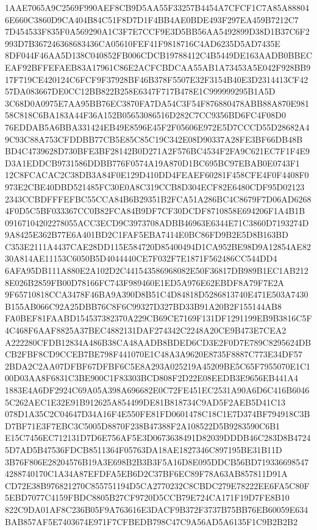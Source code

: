 \documentclass[UTF8,fontset=fandol,zihao=-4,a4paper]{ctexart}
\begin{document}
{{1AAE7065A9C2569F990AEF8CB9D5AA55F33257B4454A7CFCF1C7A85A888046E660C3860D9CA404B84C51F8D7D1F4BB4AE0BDE493F297EA459B7212C7
7D454533F835F0A569290A1C3F7E7CCF9E3D5BB56AA5492899D38D1B37C6F2993D7B367246368683436CA05610FEF41F9818716C4AD6235D5AD7435E
8DF044F46AA5D138C040852FB006CDCB19788412C4B5449DE163AADB0BBECEAF92BFFEFAEB83A17961C86E2ACFCBDCAA55AB1A73453A5E042F928BB9
17F719CE420124C6FCF9F37928BF46B378F5507E32F3154B40E3D2314413CF4257DA083667DE0CC12BB822B258E6347F717B478E1C999999295B1A5D
3C68D0A0975E7AA95BB76EC3870FA7DA54C3F54F876880478ABB88A870E98158C818C6BA183A44F36A152B05653086516D282C7CC9356BD6FC4F08D0
76EDDAB5A6BBA331424EB49E8596E45F2F05606E972E5D7CCCD55D28682A49C93C88A753CFDDBB77CB5E85C85C19C342E08D90337A28FE3BF66DB48B
BD4C4739628D730BFE3BF28142B0D271A2F576BC4534F2FA9C621EC7F1F4E9D3A1EDDCB9731586DDBB776F0574A19A870D1BC695BC97EBAB0E0743F1
12C8FCACAC2C38DB3A84F0E129D410DD4FEAEF60281F458CFE4F0F4408F0973E2CBE40DBD521485FC30E0A8C319CCB8D304ECF82E6480CDF95D02123
2343CCBDFFFEFBC55CCA84B6B29351B2FCA51A286BC4C8679F7D06AD62684F0D5C5BF033367CC0B82FCA84B9DF7CF30DCDF8710858E694206F1A4B1B
09167104202278055ACC3ECD9C3973708ADBB46963E6344E71C3860D7193274D9A8425E362B77E6A401BD2C1FAF5EBA7414E0BC86FD9B2E5D8B163BD
C353E2111A4437CAE28DD115E584720D85400494D1CA952BE98D9A12854AE8230A814AE11153C6050B5D4044440CE7F032F7E1871F562486CC544DD4
6AFA95DB111A880E2A102D2C441543586968082E50F36817DB989B1EC1AB2128E026B2859FB00D78166FC743F989460E1ED5A976E62EBDF8A79F7E2A
9F65710818CCA3478F46BA9A390D8B51C4D84818D5286813740E471E503A7430B155AB066C92A25DBB76C8F6C99327D327BD33B91A20B2F155144AB8
FA0BEF81FAABD154537382370A229CB69CE7169F131DF1291199EB9B3816C5F4C468F6AAF8825A37BEC4882131DAF274342C2248A20CE9B473E7CEA2
A222280CFDB12834A486B38CA48AADB8BDED6CD3E2F0D7E789C8295624DBCB2FBF8CD9CCEB7BE798F441070E1C48A3A9620E8735F8887C773E34DF57
2BDA2C2AA07DFBF67DFBF6C5E8A293A025219A45209BE5C65F7955070E1C100D03AA8F6831C3BE900C1F83303BCD808F2D22E08EEDB3E9656EB441A4
1883E4A6DF2924C69A05A398A696682E0C72FE451EC2531A90A6D6C416B60465C262AEC1E32E91B912625A854499DE81B818734C9AD5F2AEB5D41C13
078D1A35C2C04647D34A16F4E550FE81FD0601478C18C1E7D374BF794918C3BD7BF71E3F7EBC3C5005D8870F238B47388F2A108522D5B9283590C6B1
E15C7456EC712131D7D6E756AF5E3D0673638491D82039DDDB46C283D8B47245D7AD5B47536FDCB8511364F05763DA18AE1827346C897195BE31B11D
3B76F806E28204576B19A3E698B2B3B3F5A16D8E095DDCB56BD7193366985474288740170C1A34A87EFDFA5EB6D2C37BF6EC89F78A63AB857811D91A
CD72E38B976821270C855751194D5CA2770232C8CBDC279E78222EE6FA5C80F5EBD7077C4159FBDC8805B27CF9720D5CCB79E724CA171F19D7FE8B10
822C9DA01AF8C236B05F9A763616E3DACF9B372F3737B75BB76EB60059E634BAB857AF5E7403674E971F7CFBEDB798C47C9A56AD5A6135F1C9B2B2B2
}}
\end{document}
